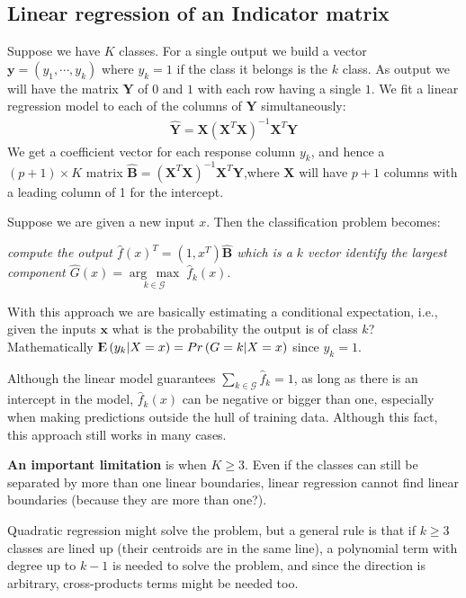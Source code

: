 \documentclass[12pt, letterpaper]{article}
\theoremstyle{definition}
\newcommand{\E}{{\rm I\kern-.3em E}}
\newcommand{\x}{\mathbf{x}}
\newcommand{\argmax}[1]{\underset{#1}{\operatorname{arg}\,\operatorname{max}}\;}
\begin{document}
\subsection{Linear regression of an Indicator matrix}
Suppose we have $K$ classes. For a single output we build a vector $\mathbf{y} = \left( y_1, \cdots, y_k\right)$ where $y_k=1$ if the class it belongs is the $k$ class. As output we will have the matrix $\mathbf{Y}$ of $0$ and $1$ with each row having a single $1$. We fit a linear regression model to each of the columns of $\mathbf{Y}$ simultaneously:
\begin{align*}
\hat{\mathbf{Y}} = \mathbf{X}\left( \mathbf{X}^T\mathbf{X}\right)^{-1}\mathbf{X}^T\mathbf{Y}
\end{align*}
We get a coefficient vector for each response column $y_k$, and hence a $(p+1) \times K$ matrix $\hat{\mathbf{B}} = \left( \mathbf{X}^T\mathbf{X}\right)^{-1}\mathbf{X}^T\mathbf{Y}$,where $\mathbf{X}$ will have $p+1$ columns with a leading column of 1 for the intercept.

Suppose we are given a new input $x$. Then the classification problem becomes:

\textit{compute the output $\hat{f}(x)^T = (1, x^T)\mathbf{\hat{B}}$ which is a $k$ vector
identify the largest component $\hat{G}(x) = \argmax{k \in \mathcal{G}} \hat{f}_k(x)$}.

With this approach we are basically estimating a conditional expectation, i.e., given the inputs $\x$ what is the probability the output is of class $k$? Mathematically $\E\left( y_k|X=x\right) =  Pr\left( G=k|X=x\right)$ since $y_k=1$.

Although the linear model guarantees $\sum_{k \in \mathcal{G}}\hat{f}_k=1$, as long as there is an intercept in the model, $\hat{f}_k(x)$ can be negative or bigger than one, especially when making predictions outside the hull of training data. Although this fact, this approach still works in many cases.

\textbf{An important limitation} is when $K\ge 3$. Even if the classes can still be separated by more than one linear boundaries, linear regression cannot find linear boundaries (because they are more than one?).

Quadratic regression might solve the problem, but a general rule is that if $k\ge3$ classes are lined up (their centroids are in the same line), a polynomial term with degree up to $k-1$ is  needed to solve the problem, and since the direction is arbitrary, cross-products terms might be needed too.
\end{document}
